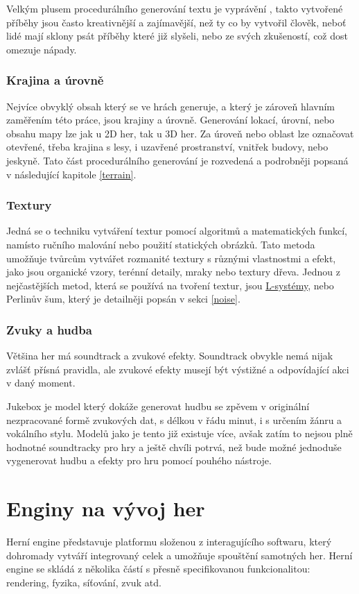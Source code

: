 Velkým plusem procedurálního generování textu je vyprávění \cite{madoc59000}, takto vytvořené příběhy jsou často kreativnější a zajímavější, než ty co by vytvořil člověk, neboť lidé mají sklony psát příběhy které již slyšeli, nebo ze svých zkušeností, což dost omezuje nápady.

\subsection{Krajina a úrovně}
Nejvíce obvyklý obsah který se ve hrách generuje, a který je zároveň hlavním zaměřením této práce, jsou krajiny a úrovně. Generování lokací, úrovní, nebo obsahu mapy lze jak u 2D her, tak u 3D her. Za úroveň nebo oblast lze označovat otevřené, třeba krajina s lesy, i uzavřené prostranství, vnitřek budovy, nebo jeskyně. Tato část procedurálního generování je rozvedená a podrobněji popsaná v následující kapitole \ref{terrain}.

\subsection{Textury}
Jedná se o techniku vytváření textur pomocí algoritmů a matematických funkcí, namísto ručního malování nebo použití statických obrázků. Tato metoda umožňuje tvůrcům vytvářet rozmanité textury s různými vlastnostmi a efekt, jako jsou organické vzory, terénní detaily, mraky nebo textury dřeva. Jednou z nejčastějších metod, která se používá na tvoření textur, jsou \hyperref[lsystems]{L-systémy}, nebo Perlinův šum, který je detailněji popsán v sekci \ref{noise}.

\subsection{Zvuky a hudba}
Většina her má soundtrack a zvukové efekty. Soundtrack obvykle nemá nijak zvlášť přísná pravidla, ale zvukové efekty musejí být výstižné a odpovídající akci v daný moment. 

Jukebox \cite{Dhariwal2020JukeboxAG} je model který dokáže generovat hudbu se zpěvem v originální nezpracované formě zvukových dat, s délkou v řádu minut, i s určením žánru a vokálního stylu. Modelů jako je tento již existuje více, avšak zatím to nejsou plně hodnotné soundtracky pro hry a ještě chvíli potrvá, než bude možné jednoduše vygenerovat hudbu a efekty pro hru pomocí pouhého nástroje.

\newpage

\chapter{Enginy na vývoj her}
\label{engines}
Herní engine představuje platformu složenou z interagujícího softwaru, který dohromady vytváří integrovaný celek a umožňuje spouštění samotných her. Herní engine se skládá z několika částí s přesně specifikovanou funkcionalitou: rendering, fyzika, síťování, zvuk atd. ~\cite{nilson2007game} 

